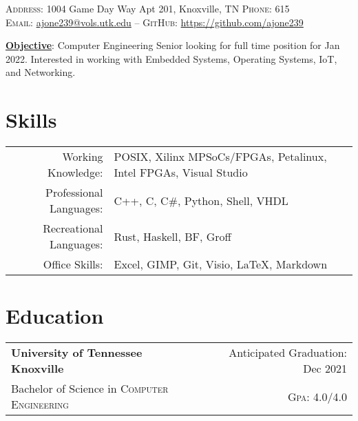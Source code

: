 \documentclass[a4paper,11pt]{article}
\begin{document}

\pagestyle{empty} %

\par{\smallskip
\par{\small \textsc{Address:} 1004 Game Day Way Apt 201, Knoxville, TN
\small \textsc{Phone:} 615\\
\textsc{Email:} \href{mailto:ajone239@vols.utk.edu}{ajone239@vols.utk.edu} \---
\textsc{GitHub:} \href{https://github.com/ajone239}{https://github.com/ajone239}
} \smallskip
\par{\textbf{\underline{Objective}}: Computer Engineering Senior looking for full time position for Jan 2022.
Interested in working with Embedded Systems, Operating Systems, IoT, and Networking.
}\smallskip}



\section{Skills}
\begin{tabularx}{\textwidth}{rl}
   Working Knowledge: & POSIX, Xilinx MPSoCs/FPGAs, Petalinux, Intel FPGAs, Visual Studio\\
   Professional Languages: & C++, C, C\#, Python, Shell, VHDL\\
   Recreational Languages: & Rust, Haskell, BF, Groff\\
   Office Skills: & Excel, GIMP, Git, Visio, \LaTeX{}, Markdown\\
\end{tabularx}

\section{Education}
\begin{tabularx}{\textwidth}{lXr}
   \textbf{University of Tennessee Knoxville} & & Anticipated Graduation: Dec 2021\\
   Bachelor of Science in \textsc{Computer Engineering} &  & \normalsize \textsc{Gpa}: 4.0/4.0\\
\end{tabularx}
\end{document}
